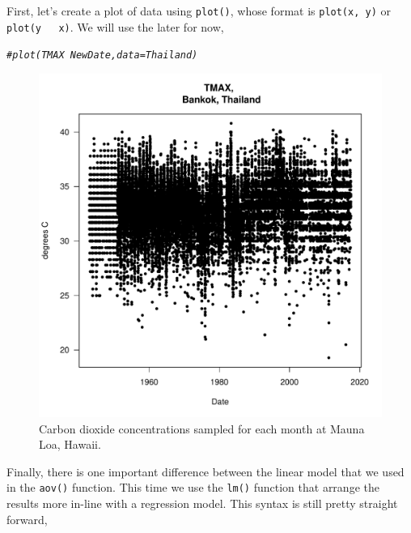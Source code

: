 \documentclass{article}\usepackage[]{graphicx}\usepackage[]{color}
\makeatletter
\def\maxwidth{ %
  \ifdim\Gin@nat@width>\linewidth
    \linewidth
  \else
    \Gin@nat@width
  \fi
}
\newcommand{\hlcom}[1]{\textcolor[rgb]{0.678,0.584,0.686}{\textit{#1}}}%
\newenvironment{kframe}{%
 \def\at@end@of@kframe{}%
 \ifinner\ifhmode%
  \def\at@end@of@kframe{\end{minipage}}%
  \begin{minipage}{\columnwidth}%
 \fi\fi%
 \def\FrameCommand##1{\hskip\@totalleftmargin \hskip-\fboxsep
 \colorbox{shadecolor}{##1}\hskip-\fboxsep
     \hskip-\linewidth \hskip-\@totalleftmargin \hskip\columnwidth}%
 \MakeFramed {\advance\hsize-\width
   \@totalleftmargin\z@ \linewidth\hsize
   \@setminipage}}%
 {\par\unskip\endMakeFramed%
 \at@end@of@kframe}
\newenvironment{knitrout}{}{} %
\makeatother
\begin{document}
First, let's create a plot of data using \texttt{plot()}, whose format is \texttt{plot(x, y)} or \texttt{plot(y ~ x)}. We will use the later for now, 

\begin{knitrout}
\color{fgcolor}\begin{kframe}
\begin{alltt}
\hlcom{#plot(TMAX ~ NewDate, data=Thailand)}
\end{alltt}
\end{kframe}
\end{knitrout}


\begin{figure}
\label{fig:test12}
\caption{Carbon dioxide concentrations sampled for each month at Mauna Loa, Hawaii.}
\begin{knitrout}
\color{fgcolor}
\includegraphics[width=\maxwidth]{figure/unnamed-chunk-13-1} 

\end{knitrout}
\end{figure}


Finally, there is one important difference between the linear model that we used in the \texttt{aov()} function. This time we use the \texttt{lm()} function that arrange the results more in-line with a regression model.
This syntax is still pretty straight forward,  
\end{document}
